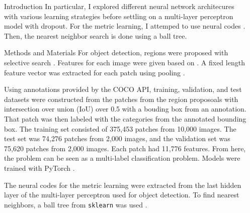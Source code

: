 \documentclass[final]{beamer}
\newlength{\onecolwid}
\newlength{\twocolwid}
\begin{document}
\begin{frame}[t]
\begin{columns}[t]
\begin{column}{\onecolwid}
\begin{block}{Introduction}
  In particular, I explored different neural network architecures with various
  learning strategies before settling on a multi-layer perceptron model with
  dropout. For the metric learning, I attemped to use neural codes
  \citep{neural_codes}. Then, the nearest neighbor search is done using a ball
  tree.
\end{block}

\begin{block}{Methods and Materials}
  For object detection, regions were proposed with selective search
  \citep{selective_search}. Features for each image were given based on
  \cite{fast_rnn}. A fixed length feature vector was extracted for each patch
  using pooling \citep{pooling}.

  Using annotations provided by the COCO API, training, validation, and test
  datasets were constructed from the patches from the region proposoals with
  intersection over union (IoU) over 0.5 with a bouding box from an
  annotation. That patch was then labeled with the categories from the annotated
  bounding box. The training set consisted of 375,453 patches from 10,000
  images. The test set was 74,276 patches from 2,000 images, and the validation
  set was 75,620 patches from 2,000 images. Each patch had 11,776 features. From
  here, the problem can be seen as a multi-label classification problem. Models
  were trained with PyTorch \citep{pytorch}.

  The neural codes for the metric learning were extracted from the last hidden
  layer of the multi-layer perceptron used for object detection. To find nearest
  neighbors, a ball tree from \texttt{sklearn} was used \citep{scikit-learn}.
\end{block}




\end{column} %

\begin{column}{\twocolwid} %

\begin{columns}[t,totalwidth=\twocolwid] %


\end{columns}
\end{column}
\end{columns}
\end{frame}
\end{document}
